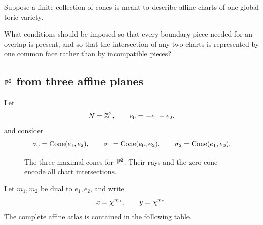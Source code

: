 \begin{prediction}
Suppose a finite collection of cones is meant to describe affine
charts of one global toric variety.

What conditions should be imposed so that every boundary piece needed
for an overlap is present, and so that the intersection of any two
charts is represented by one common face rather than by incompatible
pieces?
\end{prediction}

\subsection{\texorpdfstring{\(\mathbb{P}^2\)}{P2} from three affine planes}

Let
\[
N=\mathbb{Z}^2,
\qquad
e_0=-e_1-e_2,
\]
and consider
\[
\sigma_0=\operatorname{Cone}(e_1,e_2),
\qquad
\sigma_1=\operatorname{Cone}(e_0,e_2),
\qquad
\sigma_2=\operatorname{Cone}(e_1,e_0).
\]

\begin{figure}[ht]
\centering
{}
\caption{The three maximal cones for \(\mathbb{P}^2\). Their rays and the
zero cone encode all chart intersections.}
\label{fig:p2-three-cones}
\end{figure}

Let \(m_1,m_2\) be dual to \(e_1,e_2\), and write
\[
x=\chi^{m_1},
\qquad
y=\chi^{m_2}.
\]
The complete affine atlas is contained in the following table.

